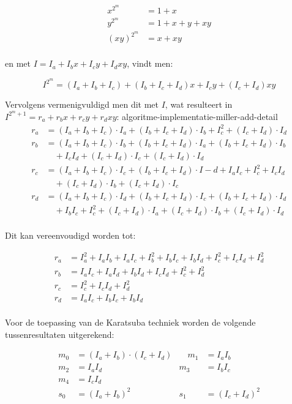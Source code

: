 \[\begin{aligned}
x^{2^m}	&= 1 + x\\
y^{2^m}	&= 1 + x + y + xy\\
(xy)^{2^m}	&= x + xy\\
\end{aligned}\]

en met $I = I_a + I_b x + I_c y + I_d xy$, vindt men:

\[I^{2^m} = (I_a + I_b + I_c) + (I_b + I_c + I_d) x + I_c y + (I_c + I_d) xy\]

Vervolgens vermenigvuldigd men dit met $I$, wat resulteert in $I^{2^m + 1} = r_a + r_b x + r_c y + r_d xy$:
algoritme-implementatie-miller-add-detail
\[\begin{aligned}
r_a	&= (I_a + I_b + I_c) \cdot I_a + (I_b + I_c + I_d) \cdot I_b + I_c^2 + (I_c + I_d) \cdot I_d\\
r_b	&= (I_a + I_b + I_c) \cdot I_b + (I_b + I_c + I_d) \cdot I_a + (I_b + I_c + I_d) \cdot I_b\\
		&\quad + I_c I_d + (I_c + I_d) \cdot I_c + (I_c + I_d) \cdot I_d\\
r_c	&= (I_a + I_b + I_c) \cdot I_c + (I_b + I_c + I_d) \cdot I-d + I_a I_c + I_c^2 + I_c I_d\\
		&\quad + (I_c + I_d) \cdot I_b + (I_c + I_d) \cdot I_c\\
r_d	&= (I_a + I_b + I_c) \cdot I_d + (I_b + I_c + I_d) \cdot I_c + (I_b + I_c + I_d) \cdot I_d\\
		&\quad + I_b I_c + I_c^2 + (I_c + I_d) \cdot I_a + (I_c + I_d) \cdot I_b + (I_c + I_d) \cdot I_d\\
\end{aligned}\]

Dit kan vereenvoudigd worden tot:

\[\begin{aligned}
r_a	&= I_a^2 + I_a I_b + I_a I_c + I_b^2 + I_b I_c + I_b I_d + I_c^2 + I_c I_d + I_d^2\\
r_b	&= I_a I_c + I_a I_d + I_b I_d + I_c I_d + I_c^2 + I_d^2\\
r_c	&= I_c^2 + I_c I_d + I_d^2\\
r_d	&= I_a I_c + I_b I_c + I_b I_d\\
\end{aligned}\]

Voor de toepassing van de Karatsuba techniek worden de volgende tussenresultaten uitgerekend:

\[\begin{aligned}
m_0	&= (I_a + I_b) \cdot (I_c + I_d)
			&\quad m_1	&= I_a I_b\\
m_2	&= I_a I_d
			&m_3	&= I_b I_c\\
m_4	&= I_c I_d\\
s_0	&= (I_a + I_b)^2
			&s_1	&= (I_c + I_d)^2\\
\end{aligned}\]

